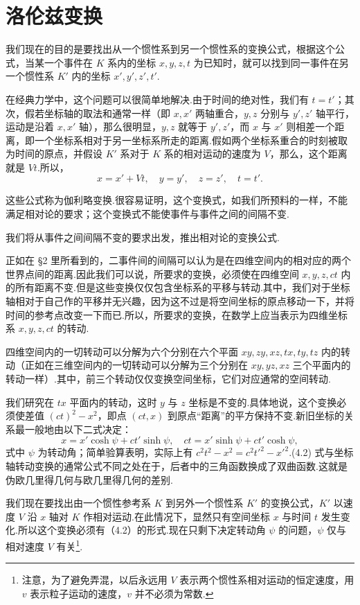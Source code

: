 \section{洛伦兹变换}

我们现在的目的是要找出从一个惯性系到另一个惯性系的变换公式，根据这个公式，当某一个事件在 $K$ 系内的坐标 $x,y,z,t$ 为已知时，就可以找到同一事件在另一个惯性系 $K'$ 内的坐标 $x',y',z',t'$.

在经典力学中，这个问题可以很简单地解决.由于时间的绝对性，我们有 $t=t'$；其次，假若坐标轴的取法和通常一样（即 $x,x'$ 两轴重合，$y,z$ 分别与 $y',z'$ 轴平行，运动是沿着 $x,x'$ 轴），那么很明显，$y,z$ 就等于 $y',z'$，而 $x$ 与 $x'$ 则相差一个距离，即一个坐标系相对于另一坐标系所走的距离.假如两个坐标系重合的时刻被取为时间的原点，并假设 $K'$ 系对于 $K$ 系的相对运动的速度为 $V$，那么，这个距离就是 $Vt$.所以，
\begin{equation}
  x=x'+Vt,\quad y=y',\quad z=z',\quad t=t'.
\end{equation}

这些公式称为伽利略变换.很容易证明，这个变换式，如我们所预料的一样，不能满足相对论的要求；这个变换式不能使事件与事件之间的间隔不变.

我们将从事件之间间隔不变的要求出发，推出相对论的变换公式.

正如在 §2 里所看到的，二事件间的间隔可以认为是在四维空间内的相对应的两个世界点间的距离.因此我们可以说，所要求的变换，必须使在四维空间 $x,y,z,ct$ 内的所有距离不变.但是这些变换仅仅包含坐标系的平移与转动.其中，我们对于坐标轴相对于自己作的平移并无兴趣，因为这不过是将空间坐标的原点移动一下，并将时间的参考点改变一下而已.所以，所要求的变换，在数学上应当表示为四维坐标系 $x,y,z,ct$ 的转动.

四维空间内的一切转动可以分解为六个分别在六个平面 $xy,zy,xz,tx,ty,tz$ 内的转动（正如在三维空间内的一切转动可以分解为三个分别在 $xy,yz,xz$ 三个平面内的转动一样）.其中，前三个转动仅仅变换空间坐标，它们对应通常的空间转动.

我们研究在 $tx$ 平面内的转动，这时 $y$ 与 $z$ 坐标是不变的.具体地说，这个变换必须使差值 $(ct)^2-x^2$，即点 $(ct,x)$ 到原点“距离”的平方保持不变.新旧坐标的关系最一般地由以下二式决定：
\begin{equation}
  x=x'\cosh\psi+ct'\sinh\psi,\quad
  ct=x'\sinh\psi+ct'\cosh\psi,
\end{equation}
式中 $\psi$ 为转动角；简单验算表明，实际上有 $c^2t^2-x^2=c^2t'^2-x'^2$.(4.2) 式与坐标轴转动变换的通常公式不同之处在于，后者中的三角函数换成了双曲函数.这就是伪欧几里得几何与欧几里得几何的差别.

我们现在要找出由一个惯性参考系 $K$ 到另外一个惯性系 $K'$ 的变换公式，$K'$ 以速度 $V$ 沿 $x$ 轴对 $K$ 作相对运动.在此情况下，显然只有空间坐标 $x$ 与时间 $t$ 发生变化.所以这个变换必须有（4.2）的形式.现在只剩下决定转动角 $\psi$ 的问题，$\psi$ 仅与相对速度 $V$ 有关\footnote{注意，为了避免弄混，以后永远用 $V$ 表示两个惯性系相对运动的恒定速度，用 $v$ 表示粒子运动的速度，$v$ 并不必须为常数.}.

